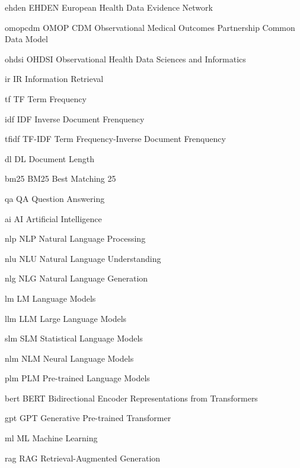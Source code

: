 

\newabbreviation
    {ehden}
    {EHDEN}
    {European Health Data Evidence Network}
\newcommand{\ehden}{\gls{ehden}}

\newabbreviation
    {omopcdm}
    {OMOP CDM}
    {Observational Medical Outcomes Partnership Common Data Model}
\newcommand{\omop}{\gls{omopcdm}}

\newabbreviation
    {ohdsi}
    {OHDSI}
    {Observational Health Data Sciences and Informatics}
\newcommand{\ohdsi}{\gls{ohdsi}}

\newabbreviation
    {ir}
    {IR}
    {Information Retrieval}
\newcommand{\ir}{\gls{ir}}

\newabbreviation
    {tf}
    {TF}
    {Term Frequency}
\newcommand{\tf}{\gls{tf}}

\newabbreviation
    {idf}
    {IDF}
    {Inverse Document Frenquency}
\newcommand{\idf}{\gls{idf}}

\newabbreviation
    {tfidf}
    {TF-IDF}
    {Term Frequency-Inverse Document Frenquency}
\newcommand{\tfidf}{\gls{tfidf}}

\newabbreviation
    {dl}
    {DL}
    {Document Length}
\newcommand{\dl}{\gls{dl}}

\newabbreviation
    {bm25}
    {BM25}
    {Best Matching 25}
\newcommand{\bm}{\gls{bm25}}

\newabbreviation
    {qa}
    {QA}
    {Question Answering}
\newcommand{\qa}{\gls{qa}}

\newabbreviation
    {ai}
    {AI}
    {Artificial Intelligence}
\newcommand{\ai}{\gls{ai}}

\newabbreviation
    {nlp}
    {NLP}
    {Natural Language Processing}
\newcommand{\nlp}{\gls{nlp}}

\newabbreviation
    {nlu}
    {NLU}
    {Natural Language Understanding}
\newcommand{\nlu}{\gls{nlu}}

\newabbreviation
    {nlg}
    {NLG}
    {Natural Language Generation}
\newcommand{\nlg}{\gls{nlg}}

\newabbreviation
    {lm}
    {LM}
    {Language Models}
\newcommand{\lm}{\gls{lm}}

\newabbreviation
    {llm}
    {LLM}
    {Large Language Models}
\newcommand{\llm}{\gls{llm}}

\newabbreviation
    {slm}
    {SLM}
    {Statistical Language Models}
\newcommand{\slm}{\gls{slm}}

\newabbreviation
    {nlm}
    {NLM}
    {Neural Language Models}
\newcommand{\nlm}{\gls{nlm}}

\newabbreviation
    {plm}
    {PLM}
    {Pre-trained Language Models}
\newcommand{\plm}{\gls{plm}}

\newabbreviation
    {bert}
    {BERT}
    {Bidirectional Encoder Representations from Transformers}
\newcommand{\bert}{\gls{bert}}

\newabbreviation
    {gpt}
    {GPT}
    {Generative Pre-trained Transformer}
\newcommand{\gpt}{\gls{gpt}}

\newabbreviation
    {ml}
    {ML}
    {Machine Learning}
\newcommand{\mlearning}{\gls{ml}}

\newabbreviation
    {rag}
    {RAG}
    {Retrieval-Augmented Generation}
\newcommand{\rag}{\gls{rag}}
